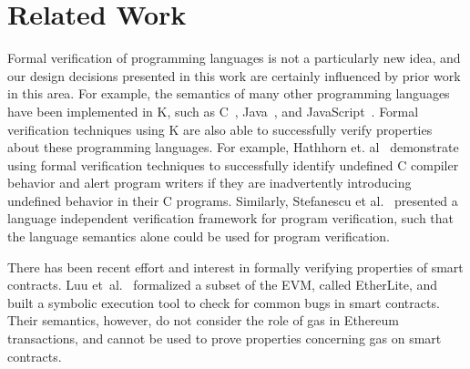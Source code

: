 \section{Related Work}
Formal verification of programming languages is not a particularly new idea,
and our design decisions presented in this work are certainly influenced by
prior work in this area. For example, the semantics of many other programming
languages have been implemented in K, such as
C~\cite{ellison-2012-thesis}, Java~\cite{bogdanas-rosu-2015-popl},
and JavaScript~\cite{park-stefanescu-rosu-2015-pldi}. Formal verification
techniques using K are also able to successfully verify properties about these
programming languages. For example, Hathhorn et.
al~\cite{hathhorn-ellison-rosu-2015-pldi} demonstrate using formal verification
techniques to successfully identify undefined C compiler behavior and alert
program writers if they are inadvertently introducing undefined behavior in
their C programs. Similarly, Stefanescu et al.~\cite{stefanescu-park-yuwen-li-rosu-2016-oopsla} presented a language independent verification framework for program verification, such that the language semantics alone could be used for program verification.

There has been recent effort and interest in formally verifying properties of
smart contracts. Luu et~al.~\cite{luumaking} formalized a subset of the EVM,
called EtherLite, and built a symbolic execution tool to check for common bugs
in smart contracts. Their semantics, however, do not consider the role of gas in
Ethereum transactions, and cannot be used to prove properties concerning gas on
smart contracts.

